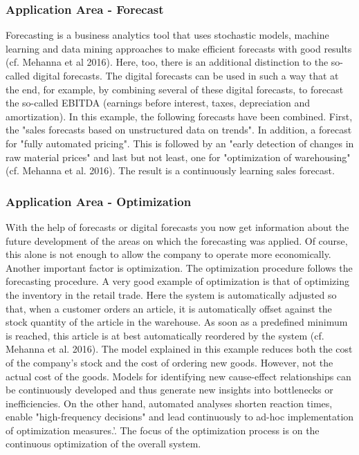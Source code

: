 \documentclass[12pt,twocolumn,twoside]{conference}   %
\begin{document}
\subsubsection{Application Area - Forecast}
Forecasting is a business analytics tool that uses stochastic models, machine learning and data mining approaches to make efficient forecasts with good results (cf. Mehanna et al 2016). Here, too, there is an additional distinction to the so-called digital forecasts. The digital forecasts can be used in such a way that at the end, for example, by combining several of these digital forecasts, to forecast the so-called EBITDA (earnings before interest, taxes, depreciation and amortization). In this example, the following forecasts have been combined. First, the "sales forecasts based on unstructured data on trends". In addition, a forecast for "fully automated pricing". This is followed by an "early detection of changes in raw material prices" and last but not least, one for "optimization of warehousing" (cf. Mehanna et al. 2016). The result is a continuously learning sales forecast. 

\subsubsection{Application Area - Optimization}
With the help of forecasts or digital forecasts you now get information about the future development of the areas on which the forecasting was applied. Of course, this alone is not enough to allow the company to operate more economically. Another important factor is optimization. The optimization procedure follows the forecasting procedure. A very good example of optimization is that of optimizing the inventory in the retail trade. Here the system is automatically adjusted so that, when a customer orders an article, it is automatically offset against the stock quantity of the article in the warehouse. As soon as a predefined minimum is reached, this article is at best automatically reordered by the system (cf. Mehanna et al. 2016). The model explained in this example reduces both the cost of the company's stock and the cost of ordering new goods. However, not the actual cost of the goods. Models for identifying new cause-effect relationships can be continuously developed and thus generate new insights into bottlenecks or inefficiencies. On the other hand, automated analyses shorten reaction times, enable "high-frequency decisions" and lead continuously to ad-hoc implementation of optimization measures.'\cite{PAPER-2}. The focus of the optimization process is on the continuous optimization of the overall system.
\end{document}
